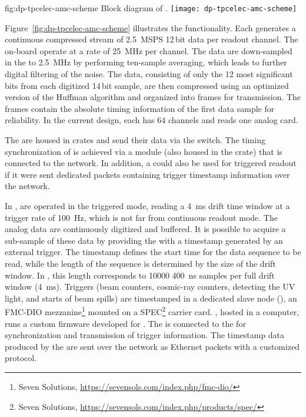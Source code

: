 \begin{dunefigure}{fig:dp-tpcelec-amc-scheme}
{Block diagram of  .}
\texttt{[image: dp-tpcelec-amc-scheme]}
\end{dunefigure}
Figure~\ref{fig:dp-tpcelec-amc-scheme} illustrates %
the  functionality. Each  generates a continuous compressed stream of \SI{2.5}{MSPS} \num{12}\,bit data per readout channel. The on-board  operate at a rate of \SI{25}{\MHz} per channel. The data are down-sampled in the  to \SI{2.5}{\MHz} by performing ten-sample averaging, which leads to further digital filtering of the noise. The data, consisting of only the  \num{12} most significant bits from each digitized \num{14}\,bit sample, are then compressed using an optimized version of the Huffman algorithm \cite{Wu:2010zzk} and organized into frames for transmission.  The frames contain the absolute timing information of the first data sample for reliability. In the current design, each  has \num{64} channels and reads one analog  card.


The  are housed in  crates and send their data via the  switch. The timing synchronization of  is achieved via a  module (also housed in the crate) that is connected to the  network. In addition, a   could also be used for triggered  readout %
if it were sent dedicated packets containing trigger timestamp information over the  network.

In ,  are operated in the triggered mode, reading a \SI{4}{\milli\second} drift time window at a trigger rate of \SI{100}{Hz}, which is not far from continuous readout mode. The analog data are continuously digitized and buffered. It is possible to acquire a sub-sample of these data by providing the  with a timestamp generated by an external trigger. The timestamp defines the start time for the data sequence to be read, while the length of the sequence is determined by the size of the drift window. In , this length corresponds to \num{10000} \SI{400}{\nano\second} samples per full drift window (\SI{4}{\milli\second}). Triggers (beam counters, cosmic-ray counters,  detecting the UV light, and starts of beam spills) are timestamped in a dedicated  slave node (), an FMC-DIO mezzanine\footnote{Seven Solutions\texttrademark{}, \url{https://sevensols.com/index.php/fmc-dio/}} mounted on a  SPEC\footnote{Seven Solutions\texttrademark{}, \url{https://sevensols.com/index.php/products/spec/}} carrier card. , hosted in a computer, runs a custom firmware developed for . 
The  is connected to the  for synchronization and transmission of trigger information. The timestamp data produced by the  are sent over the  network as Ethernet packets with a customized protocol. 


